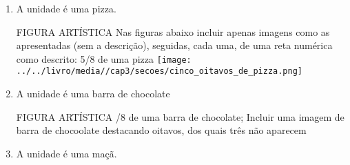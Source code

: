 \documentclass[a4,12pt]{book}
\begin{document}
\begin{enumerate} [\quad a)] %
  \item     A unidade é uma pizza. 

\begin{imagem*}[breakable]{}{}   FIGURA ARTÍSTICA   \mbox{} \newline Nas figuras abaixo incluir apenas imagens como as apresentadas (sem a descrição), seguidas, cada uma, de uma reta numérica como descrito: 5/8 de uma pizza   \mbox{} \newline        \texttt{[image: ../../livro/media//cap3/secoes/cinco\_oitavos\_de\_pizza.png]} \end{imagem*}

\begin{center}
\end{center}

\item     A unidade é uma barra de chocolate 

\begin{imagem*}[breakable]{}{}   FIGURA ARTÍSTICA   \mbox{} /8 de uma barra de chocolate;   \mbox{} \newline    Incluir uma imagem de barra de chocoolate destacando oitavos, dos quais três não aparecem \end{imagem*}
\begin{center}
\end{center}

\item     A unidade é uma maçã. 


\end{enumerate}
\end{document}
